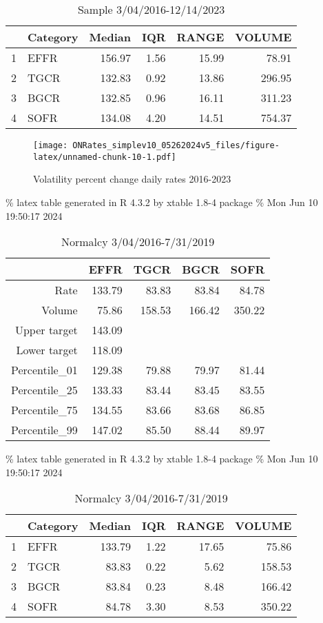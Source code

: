 \documentclass[
]{article}
\begin{document}
\begin{table}[ht]
\centering
\begin{tabular}{rlrrrr}
  \hline
 & Category & Median & IQR & RANGE & VOLUME \\ 
  \hline
1 & EFFR & 156.97 & 1.56 & 15.99 & 78.91 \\ 
  2 & TGCR & 132.83 & 0.92 & 13.86 & 296.95 \\ 
  3 & BGCR & 132.85 & 0.96 & 16.11 & 311.23 \\ 
  4 & SOFR & 134.08 & 4.20 & 14.51 & 754.37 \\ 
   \hline
\end{tabular}
\caption{Sample 3/04/2016-12/14/2023} 
\end{table}

\begin{figure}
\centering
\texttt{[image: ONRates\_simplev10\_05262024v5\_files/figure-latex/unnamed-chunk-10-1.pdf]}
\caption{\label{fig:unnamed-chunk-10}Volatility percent change daily rates 2016-2023}
\end{figure}

\% latex table generated in R 4.3.2 by xtable 1.8-4 package
\% Mon Jun 10 19:50:17 2024

\begin{table}[ht]
\centering
\begin{tabular}{rrrrr}
  \hline
 & EFFR & TGCR & BGCR & SOFR \\ 
  \hline
Rate & 133.79 & 83.83 & 83.84 & 84.78 \\ 
  Volume & 75.86 & 158.53 & 166.42 & 350.22 \\ 
  Upper target & 143.09 &  &  &  \\ 
  Lower target & 118.09 &  &  &  \\ 
  Percentile\_01 & 129.38 & 79.88 & 79.97 & 81.44 \\ 
  Percentile\_25 & 133.33 & 83.44 & 83.45 & 83.55 \\ 
  Percentile\_75 & 134.55 & 83.66 & 83.68 & 86.85 \\ 
  Percentile\_99 & 147.02 & 85.50 & 88.44 & 89.97 \\ 
   \hline
\end{tabular}
\caption{Normalcy 3/04/2016-7/31/2019} 
\end{table}

\% latex table generated in R 4.3.2 by xtable 1.8-4 package
\% Mon Jun 10 19:50:17 2024

\begin{table}[ht]
\centering
\begin{tabular}{rlrrrr}
  \hline
 & Category & Median & IQR & RANGE & VOLUME \\ 
  \hline
1 & EFFR & 133.79 & 1.22 & 17.65 & 75.86 \\ 
  2 & TGCR & 83.83 & 0.22 & 5.62 & 158.53 \\ 
  3 & BGCR & 83.84 & 0.23 & 8.48 & 166.42 \\ 
  4 & SOFR & 84.78 & 3.30 & 8.53 & 350.22 \\ 
   \hline
\end{tabular}
\caption{Normalcy 3/04/2016-7/31/2019} 
\end{table}
\end{document}
